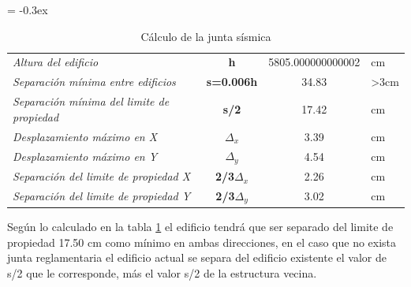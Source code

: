 \documentclass{article}%
\begin{document}
%


\begin{table}[H]%
\centering%
\caption{Cálculo de la junta sísmica}%
\extrarowheight = -0.3ex%
\renewcommand{\arraystretch}{1.5}%
\begin{tabular}{l|c|c|l}%
\cline{2-3}%
\textit{Altura del edificio} & \textbf{h} & {5805.000000000002} & {cm} \\%
\cline{2-3}%
\textit{Separación mínima entre edificios} & \textbf{s=0.006h} & {34.83} & {>3cm} \\%
\cline{2-3}%
\textit{Separación mínima del limite de propiedad} & \textbf{s/2} & {17.42} & {cm} \\%
\cline{2-3}%
\textit{Desplazamiento máximo en X} & \textbf{$\Delta_x$} & {3.39} & {cm} \\%
\cline{2-3}%
\textit{Desplazamiento máximo en Y} & \textbf{$\Delta_y$} & {4.54} & {cm} \\%
\cline{2-3}%
\textit{Separación del limite de propiedad X} & \textbf{2/3$\Delta_{x}$} & {2.26} & {cm} \\%
\cline{2-3}%
\textit{Separación del limite de propiedad Y} & \textbf{2/3$\Delta_{y}$} & {3.02} & {cm} \\%
\cline{2-3}%
\end{tabular}%
\label{tab:junta_sis}%
\end{table}

%
Según lo calculado en la tabla \ref{tab:junta_sis} %
 el edificio tendrá que ser separado del limite de propiedad 17.50 cm como mínimo en ambas direcciones, en el caso que no exista junta reglamentaria el edificio actual se separa del edificio existente el valor de s/2 que le corresponde, más el valor s/2 de la estructura vecina.

%
\end{document}
